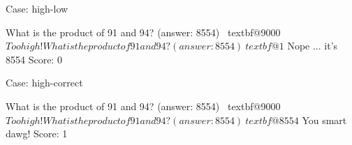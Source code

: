 Case: high-low\\
\begin{console}[commandchars=\~\@\$]
What is the product of 91 and 94? (answer: 8554) ~textbf@9000$
Too high!
What is the product of 91 and 94? (answer: 8554) ~textbf@1$
Nope ... it's 8554
Score: 0
\end{console}

Case: high-correct\\
\begin{console}[commandchars=\~\@\$]
What is the product of 91 and 94? (answer: 8554) ~textbf@9000$
Too high!
What is the product of 91 and 94? (answer: 8554) ~textbf@8554$
You smart dawg!
Score: 1
\end{console}


